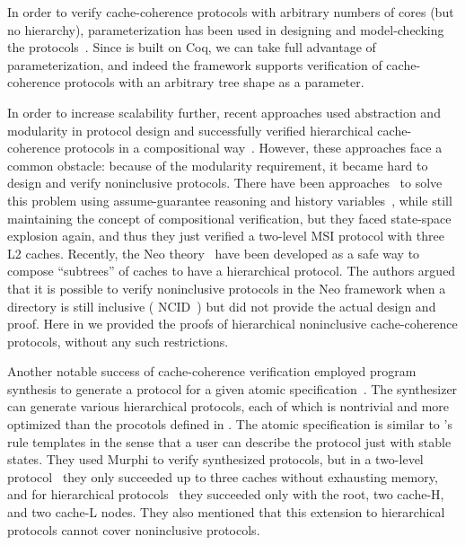 In order to verify cache-coherence protocols with arbitrary numbers of cores (but no hierarchy), parameterization has been used in designing and model-checking the protocols~\cite{Emerson:2003:1,Emerson:2003:2,Chou:2004,Zhang:2010,Zhang:2014,Banks:2017}.
Since \hemiola{} is built on Coq, we can take full advantage of parameterization, and indeed the framework supports verification of cache-coherence protocols with an arbitrary tree shape as a parameter.

In order to increase scalability further, recent approaches used abstraction and modularity in protocol design and successfully verified hierarchical cache-coherence protocols in a compositional way~\cite{Chen:2008,Chen:2010,Opeoluwa:2016,Opeoluwa:2017}.
However, these approaches face a common obstacle: because of the modularity requirement, it became hard to design and verify noninclusive protocols.
There have been approaches~\cite{Chen:2008,Chen:2010} to solve this problem using assume-guarantee reasoning and history variables~\cite{Clint:1973,Clarke:1978}, while still maintaining the concept of compositional verification, but they faced state-space explosion again, and thus they just verified a two-level MSI protocol with three L2 caches.
Recently, the Neo theory~\cite{Opeoluwa:2016,Opeoluwa:2017} have been developed as a safe way to compose ``subtrees'' of caches to have a hierarchical protocol.
The authors argued that it is possible to verify noninclusive protocols in the Neo framework when a directory is still inclusive (\eg{} NCID~\cite{Zhao:2010}) but did not provide the actual design and proof.
Here in \hemiola{} we provided the proofs of hierarchical noninclusive cache-coherence protocols, without any such restrictions.

Another notable success of cache-coherence verification employed program synthesis to generate a protocol for a given atomic specification~\cite{Oswald:2018,Oswald:2020}.
The synthesizer can generate various hierarchical protocols, each of which is nontrivial and more optimized than the procotols defined in \hemiola{}.
The atomic specification is similar to \hemiola{}'s rule templates in the sense that a user can describe the protocol just with stable states.
They used Murphi to verify synthesized protocols, but in a two-level protocol~\cite{Oswald:2018} they only succeeded up to three caches without exhausting memory, and for hierarchical protocols~\cite{Oswald:2020} they succeeded only with the root, two cache-H, and two cache-L nodes.
They also mentioned that this extension to hierarchical protocols cannot cover noninclusive protocols.

